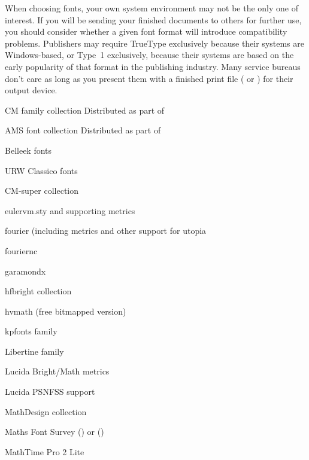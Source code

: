 When choosing fonts, your own system environment may not be the only one of
interest.  If you will be sending your finished documents to others for
further use, you should consider whether a given font format will introduce
compatibility problems.  Publishers may require TrueType exclusively because
their systems are Windows-based, or Type~1 exclusively, because their systems
are based on the early popularity of that format in the publishing industry.
Many service bureaus don't care as long as you present them with a finished
print file (\PS{} or ) for their output device.
\begin{ctanrefs}
\item[\nothtml{\normalfont}CM family collection]%
  Distributed as part of 
\item[\nothtml{\normalfont}AMS font collection]%
  Distributed as part of 
\item[Belleek \nothtml{\normalfont}fonts]%
\item[\nothtml{\normalfont} URW Classico fonts]
\item[CM-super \nothtml{\normalfont}collection]
\item[eulervm.sty \nothtml{\normalfont}and supporting metrics]%
\item[fourier \nothtml{\normalfont}(including metrics and other support for \nothtml{\itshape}utopia]%
\item[fouriernc]
\item[garamondx]
\item[hfbright \nothtml{\normalfont}collection]
\item[hvmath \nothtml{\normalfont\itshape}(free bitmapped version)]%
\item[kpfonts \nothtml{\normalfont}family]
\item[Libertine \nothtml{\normalfont}family]
\item[Lucida Bright/Math metrics]
\item[Lucida PSNFSS support]
\item[MathDesign \nothtml{\normalfont}collection]
\item[\nothtml{\normalfont}Maths Font Survey]
  () or  ()
\item[\nothtml{\normalfont}MathTime Pro 2 Lite]

\end{ctanrefs}

